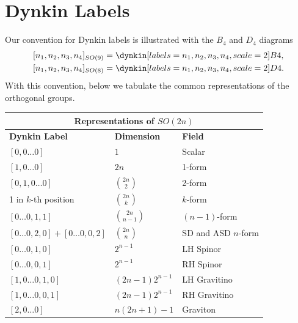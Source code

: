 \section{Dynkin Labels}
\label{sec:Dynkin Label Conventions}
Our convention for Dynkin labels is illustrated with the $B_4$ and $D_4$ diagrams
\begin{equation}
\begin{aligned}
[n_1, n_2, n_3, n_4]_{SO(9)} &= \dynkin[labels={n_1,n_2,n_3,n_4}, scale = 2]{B}{4},\\
[n_1, n_2, n_3, n_4]_{SO(8)} &= \dynkin[labels={n_1,n_2,n_3,n_4}, scale = 2]{D}{4}.
\end{aligned}
\end{equation}
With this convention, below we tabulate the common representations of the orthogonal groups.
\begin{center}
\begin{tabular}{p{} p{} p{}}
\toprule
\multicolumn{3}{c}{\textbf{Representations of } $SO(2n)$} \\
\midrule
\textbf{Dynkin Label} & \textbf{Dimension} & \textbf{Field} \\
\midrule
$[0,0\ldots 0]$                     & $1$                    & Scalar \\
$[1,0\ldots 0]$                     & $2n$                   & 1-form \\
$[0,1,0\ldots 0]$                  & $\binom{2n}{2}$        & 2-form \\
1 in $k$-th position                 & $\binom{2n}{k}$        & $k$-form \\
$[0\ldots 0,1,1]$                  & $\binom{2n}{n-1}$      & $(n-1)$-form \\
$[0\ldots 0,2,0] + [0\ldots 0,0,2]$
                                     & $\binom{2n}{n}$        & SD and ASD $n$-form \\
$[0\ldots 0,1,0]$                  & $2^{n-1}$            & LH Spinor \\
$[0\ldots 0,0,1]$                  & $2^{n-1}$            & RH Spinor \\
$[1,0\ldots 0,1,0]$               & $(2n-1)2^{n-1}$      & LH Gravitino \\
$[1,0\ldots 0,0,1]$               & $(2n-1)2^{n-1}$      & RH Gravitino \\
$[2,0\ldots 0]$                     & $n(2n+1)-1$            & Graviton \\
\bottomrule
\end{tabular}
\end{center}

